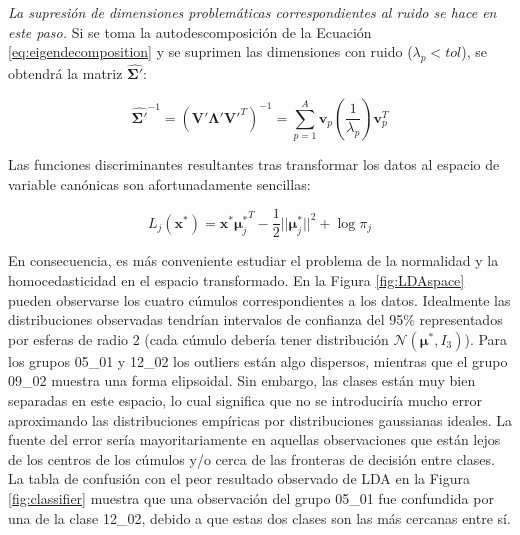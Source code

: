 \documentclass[12pt]{article}
\begin{document}
\textit{La supresión de dimensiones problemáticas correspondientes al ruido se hace en este paso.} Si se toma la autodescomposición de la Ecuación \ref{eq:eigendecomposition} y se suprimen las dimensiones con ruido ($\lambda_p < tol$), se obtendrá la matriz $\hat{\boldsymbol{\Sigma}'}$:

\begin{equation} \label{eq:reduction}
\hat{\boldsymbol{\Sigma}'}^{-1} = (\mathbf{V}' \boldsymbol{\Lambda}' \mathbf{V}'^T)^{-1} = \sum_{p = 1}^{A} \mathbf{v}_p (\frac{1}{\lambda_p}) \mathbf{v}_p^T 
\end{equation}


Las funciones discriminantes resultantes tras transformar los datos al espacio de variable canónicas son afortunadamente sencillas:

\begin{equation} \label{eq:lineal_discriminant_proy}
L_j (\mathbf{x}^{*}) = \mathbf{x}^{*} {\boldsymbol{\mu}^{*}_j}^T - \frac{1}{2} ||\boldsymbol{\mu}^{*}_j||^2 + \log \pi_j
\end{equation}

En consecuencia, es más conveniente estudiar el problema de la normalidad y la homocedasticidad en el espacio transformado. En la Figura \ref{fig:LDAspace} pueden observarse los cuatro cúmulos correspondientes a los datos. Idealmente las distribuciones observadas tendrían intervalos de confianza del 95\% representados por esferas de radio 2 (cada cúmulo debería tener distribución $\mathcal{N}(\boldsymbol{\mu}^{*},I_3)$). Para los grupos 05\_01 y 12\_02 los outliers están algo dispersos, mientras que el grupo 09\_02 muestra una forma elipsoidal. Sin embargo, las clases están muy bien separadas en este espacio, lo cual significa que no se introduciría mucho error aproximando las distribuciones empíricas por distribuciones gaussianas ideales. La fuente del error sería mayoritariamente en aquellas observaciones que están lejos de los centros de los cúmulos y/o cerca de las fronteras de decisión entre clases. La tabla de confusión con el peor resultado observado de LDA en la Figura \ref{fig:classifier} muestra que una observación del grupo 05\_01 fue confundida por una de la clase 12\_02, debido a que estas dos clases son las más cercanas entre sí.
\end{document}
